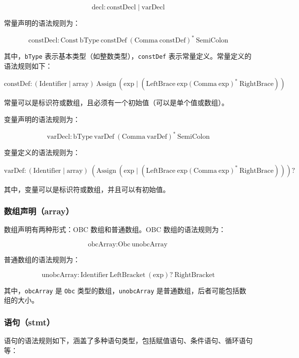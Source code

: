 \documentclass[../main.tex]{subfiles}
\begin{document}
\[
	\text{decl} \colon \text{constDecl} \mid \text{varDecl}
\]

常量声明的语法规则为：

\[
	\text{constDecl} \colon \text{Const} \ \text{bType} \ \text{constDef} \ (\text{Comma} \ \text{constDef})^* \ \text{SemiColon}
\]

其中，\texttt{bType} 表示基本类型（如整数类型），\texttt{constDef} 表示常量定义。常量定义的语法规则如下：

\[
	\text{constDef} \colon (\text{Identifier} \mid \text{array}) \ \text{Assign} \ (\text{exp} \mid (\text{LeftBrace} \ \text{exp} (\text{Comma} \ \text{exp})^* \ \text{RightBrace}))
\]

常量可以是标识符或数组，且必须有一个初始值（可以是单个值或数组）。

变量声明的语法规则为：

\[
	\text{varDecl} \colon \text{bType} \ \text{varDef} \ (\text{Comma} \ \text{varDef})^* \ \text{SemiColon}
\]

变量定义的语法规则为：

\[
	\text{varDef} \colon (\text{Identifier} \mid \text{array}) \ (\text{Assign} \ (\text{exp} \mid (\text{LeftBrace} \ \text{exp} (\text{Comma} \ \text{exp})^* \ \text{RightBrace})) )?
\]

其中，变量可以是标识符或数组，并且可以有初始值。

\subsubsection{数组声明（array）}

数组声明有两种形式：OBC 数组和普通数组。OBC 数组的语法规则为：

\[
	\text{obcArray} \colon \text{Obc} \ \text{unobcArray}
\]

普通数组的语法规则为：

\[
	\text{unobcArray} \colon \text{Identifier} \ \text{LeftBracket} \ (\text{exp})? \ \text{RightBracket}
\]

其中，\texttt{obcArray} 是 \texttt{Obc} 类型的数组，\texttt{unobcArray} 是普通数组，后者可能包括数组的大小。

\subsubsection{语句（stmt）}

语句的语法规则如下，涵盖了多种语句类型，包括赋值语句、条件语句、循环语句等：
\end{document}

